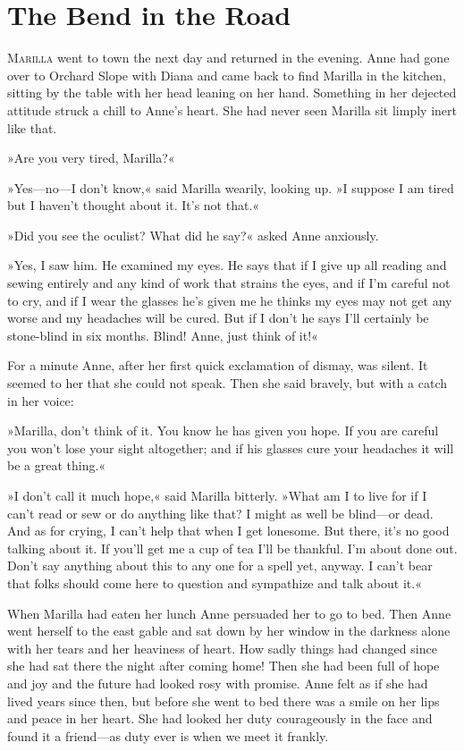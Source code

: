 \chapter{The Bend in the Road}

\lettrine[lines=4]{M}{arilla} went to town the next day and returned in the evening. Anne had gone over to Orchard Slope with Diana and came back to find Marilla in the kitchen, sitting by the table with her head leaning on her hand. Something in her dejected attitude struck a chill to Anne’s heart. She had never seen Marilla sit limply inert like that.

»Are you very tired, Marilla?«

»Yes—no—I don’t know,« said Marilla wearily, looking up. »I suppose I am tired but I haven’t thought about it. It’s not that.«

»Did you see the oculist? What did he say?« asked Anne anxiously.

»Yes, I saw him. He examined my eyes. He says that if I give up all reading and sewing entirely and any kind of work that strains the eyes, and if I’m careful not to cry, and if I wear the glasses he’s given me he thinks my eyes may not get any worse and my headaches will be cured. But if I don’t he says I’ll certainly be stone-blind in six months. Blind! Anne, just think of it!«

For a minute Anne, after her first quick exclamation of dismay, was silent. It seemed to her that she could not speak. Then she said bravely, but with a catch in her voice:

»Marilla, don’t think of it. You know he has given you hope. If you are careful you won’t lose your sight altogether; and if his glasses cure your headaches it will be a great thing.«

»I don’t call it much hope,« said Marilla bitterly. »What am I to live for if I can’t read or sew or do anything like that? I might as well be blind—or dead. And as for crying, I can’t help that when I get lonesome. But there, it’s no good talking about it. If you’ll get me a cup of tea I’ll be thankful. I’m about done out. Don’t say anything about this to any one for a spell yet, anyway. I can’t bear that folks should come here to question and sympathize and talk about it.«

When Marilla had eaten her lunch Anne persuaded her to go to bed. Then Anne went herself to the east gable and sat down by her window in the darkness alone with her tears and her heaviness of heart. How sadly things had changed since she had sat there the night after coming home! Then she had been full of hope and joy and the future had looked rosy with promise. Anne felt as if she had lived years since then, but before she went to bed there was a smile on her lips and peace in her heart. She had looked her duty courageously in the face and found it a friend—as duty ever is when we meet it frankly.

